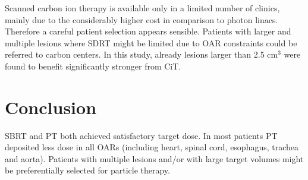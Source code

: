 \documentclass[type=dr, dr=rernat, acm$^3$entcolor=tud7b,colorbacktitle, bigchapter, openright, twoside, 12pt ]{tudthesis}
\begin{document}
Scanned carbon ion therapy is available only in a limited number of clinics, mainly due to the considerably higher cost in comparison to photon linacs.
Therefore a careful patient selection appears sensible. Patients with larger and multiple lesions where SDRT might be limited due to OAR constraints 
could be referred to carbon centers. In this study, already lesions larger than 2.5 cm$^3$ were found to benefit significantly stronger from CiT.

\section{Conclusion}
SBRT and PT both achieved satisfactory target dose. In most patients PT deposited less dose in all OARs (including heart, spinal cord, esophagus, trachea and aorta). Patients with multiple lesions and/or with large target volumes might be preferentially selected for particle therapy.



{}
\end{document}
